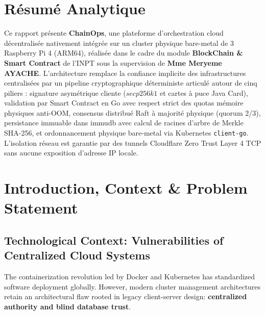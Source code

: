 \documentclass[a4paper,12pt]{article}
\begin{document}
\section*{Résumé Analytique}

Ce rapport présente \textbf{ChainOps}, une plateforme d'orchestration cloud décentralisée nativement intégrée sur un cluster physique bare-metal de 3 Raspberry Pi 4 (ARM64), réalisée dans le cadre du module \textbf{BlockChain \& Smart Contract} de l'INPT sous la supervision de \textbf{Mme Meryeme AYACHE}. L'architecture remplace la confiance implicite des infrastructures centralisées par un pipeline cryptographique déterministe articulé autour de cinq piliers : signature asymétrique cliente ($secp256k1$ et cartes à puce Java Card), validation par Smart Contract en Go avec respect strict des quotas mémoire physiques anti-OOM, consensus distribué Raft à majorité physique (quorum 2/3), persistance immuable dans immudb avec calcul de racines d'arbre de Merkle SHA-256, et ordonnancement physique bare-metal via Kubernetes \texttt{client-go}. L'isolation réseau est garantie par des tunnels Cloudflare Zero Trust Layer 4 TCP sans aucune exposition d'adresse IP locale.

\newpage

\section{Introduction, Context \& Problem Statement}

\subsection{Technological Context: Vulnerabilities of Centralized Cloud Systems}

The containerization revolution led by Docker and Kubernetes has standardized software deployment globally. However, modern cluster management architectures retain an architectural flaw rooted in legacy client-server design: \textbf{centralized authority and blind database trust}.
\end{document}
